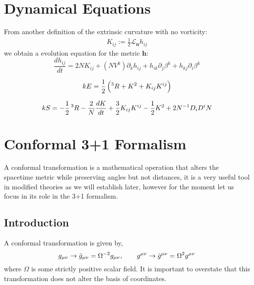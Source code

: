 \section{Dynamical Equations}


From another definition of the extrinsic curvature with no vorticity:
\begin{align}
    K_{ij} := \frac{1}{2} \mathcal{L}_{\mathbf{n}} h_{ij}
\end{align}
we obtain a evolution equation for the metric $\mathbf{h}$:
\begin{equation}
    \frac{d h_{ij}}{dt} = 2NK_{ij}+(NV^k) \partial_k h_{ij} + h_{ik}\partial_j \beta^k + h_{kj}\partial_i \beta^k
\end{equation}







\begin{equation}
    kE=\frac{1}{2}\left(\prescript{3}{}R+K^2+K_{ij}K^{ij}\right)
    \label{eqn:energy_equation}
\end{equation}

\begin{equation}
    kS=-\frac{1}{2}\prescript{3}{}R-\frac{2}{N}\frac{dK}{dt}+\frac{3}{2}K_{ij}K^{ij}-\frac{1}{2}K^2+2N^{-1}D_iD^iN
    \label{eqn:pressure_equation}
\end{equation}


\section{Conformal 3+1 Formalism}

A conformal transformation is a mathematical operation that alters the spacetime metric while preserving angles but not distances, it is a very useful tool in modified theories as we will establish later, however for the moment let us focus in its role in the 3+1 formalism.

\subsection{Introduction}

A conformal transformation is given by,
\begin{equation}
    g_{\mu\nu}\rightarrow \Tilde{g}_{\mu\nu}=\Omega^{-2}g_{\mu\nu}, \qquad g^{\mu\nu}\rightarrow \Tilde{g}^{\mu\nu}=\Omega^{2}g^{\mu\nu}
    \label{eqn:def_conf_transf}
\end{equation}
where $\Omega$ is some strictly positive scalar field. It is important to overstate that this transformation does not alter the basis of coordinates. 

